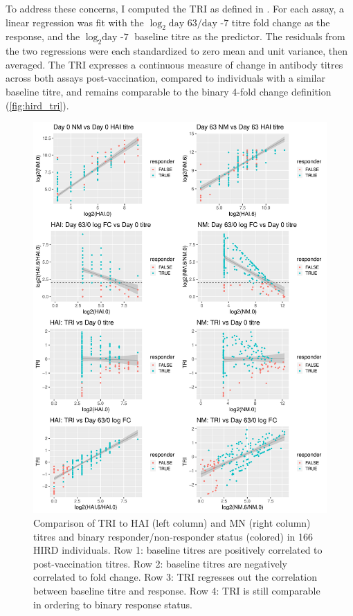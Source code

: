 To address these concerns, I computed the \gls{TRI} as defined in \textcite{bucasas2011EarlyPatternsGene}.
For each assay, a linear regression was fit with the $\log_2{\text{day 63}/\text{day -7}}$ titre fold change as the response, and the $\log_2{\text{day -7}}$ baseline titre as the predictor.
The residuals from the two regressions were each standardized to zero mean and unit variance, then averaged.
The \gls{TRI} expresses a continuous measure of change in antibody titres across both assays post-vaccination, compared to individuals with a similar baseline titre, and remains comparable to the binary 4-fold change definition (\autoref{fig:hird_tri}).

\begin{figure}
    \includegraphics[width=1.0\textwidth]{mainmatter/figures/chapter_02/phenotype_data_setup.tri_comparison.pdf}
    \caption{Comparison of \gls{TRI} to \gls{HAI} (left column) and \gls{MN} (right column) titres and binary responder/non-responder status (colored) in 166 \gls{HIRD} individuals. Row 1: baseline titres are positively correlated to post-vaccination titres. Row 2: baseline titres are negatively correlated to fold change. Row 3: \gls{TRI} regresses out the correlation between baseline titre and response. Row 4: \gls{TRI} is still comparable in ordering to binary response status.}
    \label{fig:hird_tri}
\end{figure} 

